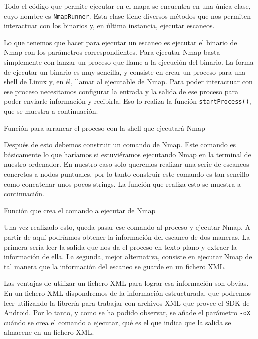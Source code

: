 Todo el código que permite ejecutar en el mapa se encuentra en una única clase, cuyo nombre es \texttt{NmapRunner}. Esta clase tiene diversos métodos que nos permiten interactuar con los binarios y, en última instancia, ejecutar escaneos.

Lo que tenemos que hacer para ejecutar un escaneo es ejecutar el binario de Nmap con los parámetros correspondientes. Para ejecutar Nmap basta simplemente con lanzar un proceso que llame a la ejecución del binario. La forma de ejecutar un binario es muy sencilla, y consiste en crear un proceso para una shell de Linux y, en él, llamar al ejecutable de Nmap. Para poder interactuar con ese proceso necesitamos configurar la entrada y la salida de ese proceso para poder enviarle información y recibirla. Eso lo realiza la función \texttt{startProcess()}, que se muestra a continuación.

\begin{code}
	\caption{Función para arrancar el proceso con la shell que ejecutará Nmap}
	\label{code:startProcess}
	
\end{code}

Después de esto debemos construir un comando de Nmap. Este comando es básicamente lo que haríamos si estuviéramos ejecutando Nmap en la terminal de nuestro ordenador. En nuestro caso solo queremos realizar una serie de escaneos concretos a nodos puntuales, por lo tanto construir este comando es tan sencillo como concatenar unos pocos strings. La función que realiza esto se muestra a continuación.

\begin{code}
	\caption{Función que crea el comando a ejecutar de Nmap}
	\label{code:commandBuilder}
	
\end{code}

Una vez realizado esto, queda pasar ese comando al proceso y ejecutar Nmap. A partir de aquí podríamos obtener la información del escaneo de dos maneras. La primera sería leer la salida que nos da el proceso en texto plano y extraer la información de ella. La segunda, mejor alternativa, consiste en ejecutar Nmap de tal manera que la información del escaneo se guarde en un fichero XML.

Las ventajas de utilizar un fichero XML para lograr esa información son obvias. En un fichero XML dispondremos de la información estructurada, que podremos leer utilizando la librería para trabajar con archivos XML que provee el SDK de Android. Por lo tanto, y como se ha podido observar, se añade el parámetro \texttt{-oX} cuándo se crea el comando a ejecutar, qué es el que indica que la salida se almacene en un fichero XML.


